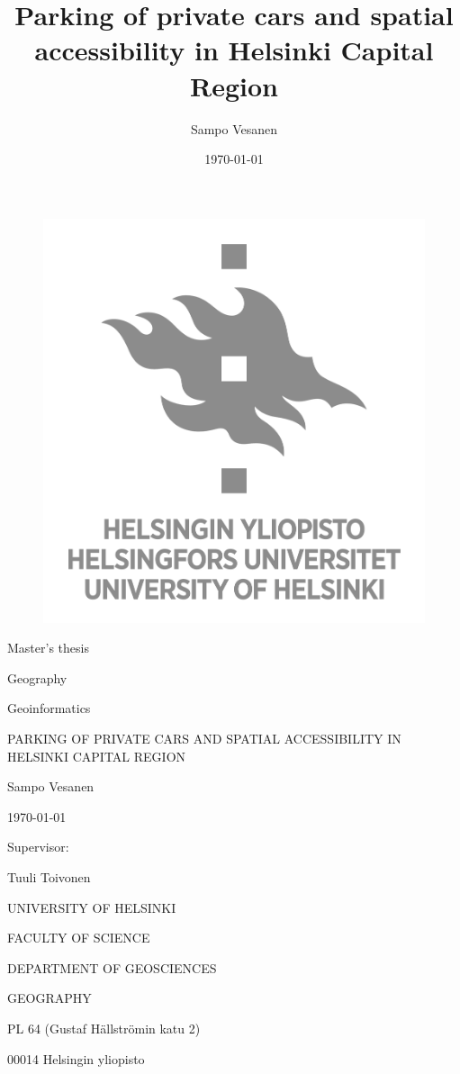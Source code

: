 \documentclass[a4paper,11pt]{article}
\author{Sampo Vesanen}
\date{\today}
\title{Parking of private cars and spatial accessibility in Helsinki Capital Region}
\begin{document}
\begin{titlepage}
{
\centering
\begin{figure}[t]
\centering
\includegraphics[scale=0.4]{HY_logo}
\end{figure}

Master's thesis \par
Geography \par
Geoinformatics \par

\bigskip
PARKING OF PRIVATE CARS AND SPATIAL ACCESSIBILITY IN HELSINKI CAPITAL REGION

\bigskip
Sampo Vesanen

\today

\vfill 

Supervisor: \par
Tuuli Toivonen \par
\bigskip
\bigskip
UNIVERSITY OF HELSINKI\par
FACULTY OF SCIENCE\par
DEPARTMENT OF GEOSCIENCES\par
GEOGRAPHY\par
PL 64 (Gustaf Hällströmin katu 2)\par
00014 Helsingin yliopisto\par
}
\end{titlepage}
\end{document}
